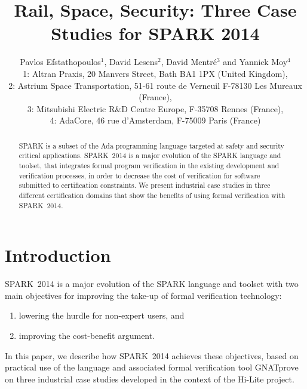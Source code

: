\documentclass[10pt,a4paper,twocolumn]{article}
\newcommand{\hilite}{Hi-Lite\xspace}
\newcommand{\gnatprove}{GNATprove\xspace}
\newcommand{\newspark}{SPARK~2014\xspace}
\begin{document}
\title{Rail, Space, Security: Three Case Studies for SPARK 2014}

\author{%
\large Pavlos Efstathopoulos$^1$, David Lesens$^2$, David Mentré$^3$ and Yannick Moy$^4$\\
\normalsize 1: Altran Praxis, 20 Manvers Street, Bath BA1 1PX (United Kingdom),\\
\normalsize 2: Astrium Space Transportation, 51-61 route de Verneuil F-78130 Les Mureaux (France),\\
\normalsize 3: Mitsubishi Electric R\&D Centre Europe, F-35708 Rennes (France),\\
\normalsize 4: AdaCore, 46 rue d'Amsterdam, F-75009 Paris (France)}

\date{}

\maketitle

\begin{abstract}
SPARK is a subset of the Ada programming language targeted at safety and
security critical applications. \newspark is a major evolution of the SPARK
language and toolset, that integrates formal program verification in the
existing development and verification processes, in order to decrease the cost
of verification for software submitted to certification constraints. We present
industrial case studies in three different certification domains that show the
benefits of using formal verification with \newspark.
\end{abstract}

\section{Introduction}

\newspark is a major evolution of the SPARK language and toolset with two main objectives for improving the take-up of formal verification technology:
%
\begin{enumerate}
\item lowering the hurdle for non-expert users, and
\item improving the cost-benefit argument.
\end{enumerate}

In this paper, we describe how \newspark achieves these objectives, based on
practical use of the language and associated formal verification tool
\gnatprove on three industrial case studies developed in the context of the
\hilite project.
\end{document}
